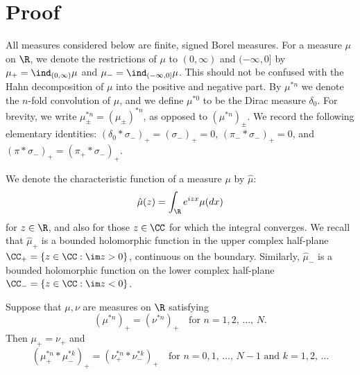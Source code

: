 \section{Proof}

All measures considered below are finite, signed Borel measures. For a measure $\mu$ on $\R$, we denote the restrictions of $\mu$ to $(0, \infty)$ and $(-\infty, 0]$ by $\mu_+ = \ind_{(0, \infty)} \mu$ and $\mu_- = \ind_{(-\infty, 0]} \mu$. This should not be confused with the Hahn decomposition of $\mu$ into the positive and negative part. By $\mu^{*n}$ we denote the $n$-fold convolution of $\mu$, and we define $\mu^{*0}$ to be the Dirac measure $\delta_0$. For brevity, we write $\mu_\pm^{*n} = (\mu_\pm)^{*n}$, as opposed to $(\mu^{*n})_\pm$. We record the following elementary identities: $(\delta_0 * \sigma_-)_+ = (\sigma_-)_+ = 0$, $(\pi_- * \sigma_-)_+ = 0$, and $(\pi * \sigma_-)_+ = (\pi_+ * \sigma_-)_+$.

We denote the characteristic function of a measure $\mu$ by $\hat\mu$:
\[
\hat\mu(z) = \int_\R e^{i z x} \mu(dx) 
\]
for $z \in \R$, and also for those $z \in \CC$ for which the integral converges. We recall that $\hat\mu_+$ is a bounded holomorphic function in the upper complex half-plane $\CC_+ =\linebreak\{z \in \CC : \im z > 0\}$, continuous on the boundary. Similarly, $\hat\mu_-$ is a bounded holomorphic function on the lower complex half-plane $\CC_- = \{z \in \CC : \im z < 0\}$.

\begin{lemm}\label{lem:mupm}
Suppose that $\mu, \nu$ are measures on $\R$ satisfying
\[
(\mu^{*n})_+ = (\nu^{*n})_+\quad\text{for }n = 1, 2,\,\ldots,\,N.
\]
Then $\mu_+ = \nu_+$ and
\begin{equation}\label{eq:mupm}
\left(\mu_+^{*n} * \mu_-^{*k}\right)_+ = \left(\nu_+^{*n} * \nu_-^{*k}\right)_+ \quad\text{for }n = 0, 1,\,\ldots,\,N - 1\text{ and }k = 1, 2,\,\ldots
\end{equation}
\end{lemm}

